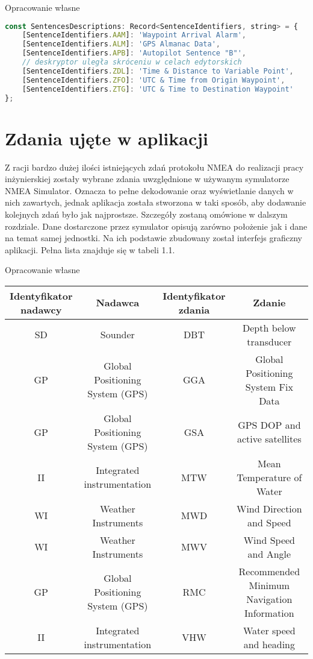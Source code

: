\documentclass[skorowidz,skroty]{dyplomWEZUT}
\begin{document}
{Opracowanie własne}{\label{code: sentences descriptors}}
\begin{lstlisting}[language=JavaScript]
const SentencesDescriptions: Record<SentenceIdentifiers, string> = {
    [SentenceIdentifiers.AAM]: 'Waypoint Arrival Alarm',
    [SentenceIdentifiers.ALM]: 'GPS Almanac Data',
    [SentenceIdentifiers.APB]: 'Autopilot Sentence "B"',
    // deskryptor uległa skróceniu w celach edytorskich
    [SentenceIdentifiers.ZDL]: 'Time & Distance to Variable Point',
    [SentenceIdentifiers.ZFO]: 'UTC & Time from Origin Waypoint',
    [SentenceIdentifiers.ZTG]: 'UTC & Time to Destination Waypoint'
};
\end{lstlisting}

\section{Zdania ujęte w aplikacji}\label{sec:application sentences}
Z racji bardzo dużej ilości istniejących zdań protokołu NMEA do realizacji pracy inżynierskiej zostały wybrane zdania uwzględnione w używanym symulatorze NMEA Simulator. Oznacza to pełne dekodowanie oraz wyświetlanie danych w nich zawartych, jednak aplikacja została stworzona w taki sposób, aby dodawanie kolejnych zdań było jak najprostsze. Szczegóły zostaną omówione w dalszym rozdziale. Dane dostarczone przez symulator opisują zarówno położenie jak i dane na temat samej jednostki. Na ich podstawie zbudowany został interfejs graficzny aplikacji. Pełna lista znajduje się w tabeli 1.1.

{Opracowanie własne}
{\begin{tabular}{c|c|c|c}
\thead{Identyfikator \\ nadawcy} & Nadawca & \thead{Identyfikator \\ zdania} & Zdanie \\\hline\hline
SD & Sounder & DBT & Depth below transducer\\
\hline
GP & \makecell{Global Positioning \\ System (GPS)} & GGA & Global Positioning System Fix Data\\
\hline
GP & \makecell{Global Positioning \\ System (GPS)} & GSA & GPS DOP and active satellites\\
\hline
II & Integrated instrumentation & MTW & Mean Temperature of Water\\
\hline
WI & Weather Instruments & MWD & Wind Direction and Speed\\
\hline
WI & Weather Instruments & MWV &  Wind Speed and Angle\\
\hline
GP &\makecell{Global Positioning \\ System (GPS)} & RMC & \makecell{Recommended Minimum \\ Navigation Information}\\
\hline
II & Integrated instrumentation & VHW & Water speed and heading
\end{tabular}}
\end{document}
